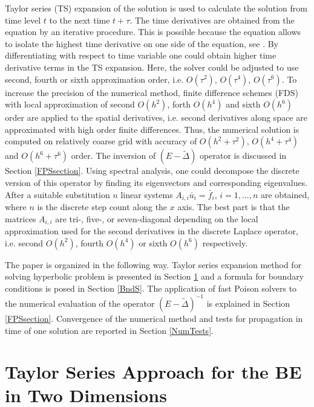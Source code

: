 \documentclass[11pt,a4paper,twoside]{article}
\begin{document}
Taylor series (TS) expansion of the solution is used to calculate the solution from time level $t$ to the next time  $t+\tau$.
The time derivatives
are obtained from the equation  by an iterative procedure. This is possible because the equation allows to isolate the highest time derivative on one side of the equation, see . By differentiating with respect to time variable one could obtain higher time derivative terms in the TS expansion. Here, the solver could be adjusted to use second, fourth or sixth approximation order, i.e. $O(\tau^2)$, $O(\tau^4)$, $O(\tau^6)$. To increase the precision of the numerical method, finite difference schemes (FDS) with local approximation of second $O(h^2)$, forth $O(h^4)$ and sixth $O(h^6)$ order are  applied to the spatial derivatives, i.e.  second derivatives along space are approximated with high order finite differences. Thus, the numerical solution is computed on relatively coarse grid with  accuracy of $O(h^2+\tau^2)$, $O(h^4+\tau^4)$ and $O(h^6+\tau^6)$ order. The inversion of $(E - \tilde \Delta)$ operator is discussed in Section \ref{FPSsection}. Using spectral analysis, one could decompose the discrete version of this operator by finding its eigenvectors and corresponding eigenvalues. After a suitable substitution $n$ linear systems $A_{i,i} \bar u_i = \bar f_i$, $i = 1,...,n$ are obtained, where $n$ is the discrete step count along the $x$ axis. The best part is that the matrices $A_{i,i}$ are tri-, five-, or seven-diagonal depending on the local approximation used for the second derivatives in the discrete Laplace operator, i.e. second $O(h^2)$,  fourth $O(h^4)$ or sixth $O(h^6)$ respectively. 

The paper is organized in the following way.  Taylor series expansion method for solving hyperbolic problem is presented in Section \ref{TaylorA} and  a formula for boundary conditions is posed in  Section \ref{BndS}. The application of fast Poison solvers to the numerical evaluation of the operator $(E - \tilde \Delta)^{-1}$ is explained in Section \ref{FPSsection}. Convergence of the numerical method and tests for propagation in time of one solution are reported in Section \ref{NumTests}. 

\section{Taylor Series Approach for the BE in Two Dimensions}\label{TaylorA}
\end{document}
